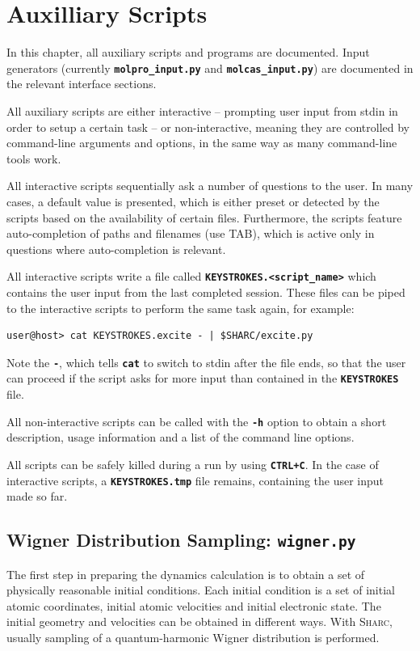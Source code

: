 \documentclass[a4paper,11pt,DIV=15,openany,twoside=false]{scrbook}
\newcommand{\sharc}{\textsc{Sharc}}
\newcommand{\ttt}[1]{\textbf{\texttt{#1}}}
\begin{document}
\chapter{Auxilliary Scripts}\label{chap:aux}

In this chapter, all auxiliary scripts and programs are documented. Input generators (currently \ttt{molpro\_input.py} and \ttt{molcas\_input.py}) are documented in the relevant interface sections.

All auxiliary scripts are either interactive -- prompting user input from stdin in order to setup a certain task -- or non-interactive, meaning they are controlled by command-line arguments and options, in the same way as many command-line tools work.

All interactive scripts sequentially ask a number of questions to the user. In many cases, a default value is presented, which is either preset or detected by the scripts based on the availability of certain files. Furthermore, the scripts feature auto-completion of paths and filenames (use TAB), which is active only in questions where auto-completion is relevant.

All interactive scripts write a file called \ttt{KEYSTROKES.<script\_name>} which contains the user input from the last completed session. These files can be piped to the interactive scripts to perform the same task again, for example:
\begin{verbatim}
user@host> cat KEYSTROKES.excite - | $SHARC/excite.py
\end{verbatim}
Note the \ttt{-}, which tells \ttt{cat} to switch to stdin after the file ends, so that the user can proceed if the script asks for more input than contained in the \ttt{KEYSTROKES} file.

All non-interactive scripts can be called with the \ttt{-h} option to obtain a short description, usage information and a list of the command line options.

All scripts can be safely killed during a run by using \ttt{CTRL+C}. In the case of interactive scripts, a \ttt{KEYSTROKES.tmp} file remains, containing the user input made so far.

\section{Wigner Distribution Sampling: \ttt{wigner.py}}\label{sec:wigner.py}

The first step in preparing the dynamics calculation is to obtain a set of physically reasonable initial conditions. Each initial condition is a set of initial atomic coordinates, initial atomic velocities and initial electronic state. The initial geometry and velocities can be obtained in different ways. With \sharc, usually sampling of a quantum-harmonic Wigner distribution is performed. 
\end{document}
